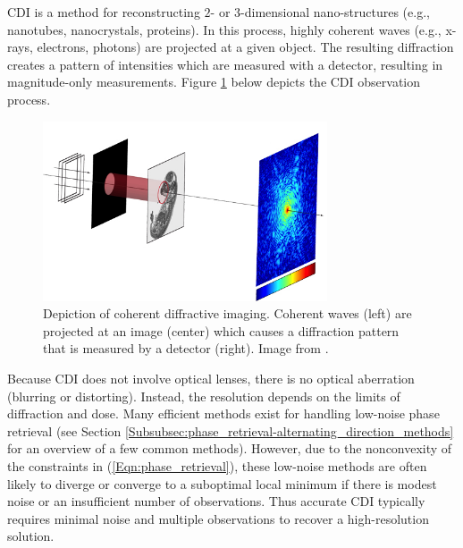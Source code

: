 CDI is a method for reconstructing $2$- or $3$-dimensional nano-structures (e.g., nanotubes, nanocrystals, proteins).  In this process, highly coherent waves (e.g., x-rays, electrons, photons) are projected at a given object.  The resulting diffraction creates a pattern of intensities which are measured with a detector, resulting in magnitude-only measurements.  Figure \ref{Fig:CDI} below depicts the CDI observation process.

\begin{figure}[H]
  \centering
    \includegraphics[width=0.75\textwidth]{phase_retrieval_depiction_mod.jpg}
   \caption{Depiction of coherent diffractive imaging.  Coherent waves (left) are projected at an image (center) which causes a diffraction pattern that is measured by a detector (right). Image from \cite{Guizar-Sicairos}.}
   \label{Fig:CDI}
\end{figure}

Because CDI does not involve optical lenses, there is no optical aberration (blurring or distorting).  Instead, the resolution depends on the limits of diffraction and dose.  Many efficient methods exist for handling low-noise phase retrieval (see Section \ref{Subsubsec:phase_retrieval-alternating_direction_methods} for an overview of a few common methods).  However, due to the nonconvexity of the constraints in (\ref{Eqn:phase_retrieval}), these low-noise methods are often likely to diverge or converge to a suboptimal local minimum if there is modest noise or an insufficient number of observations.  Thus accurate CDI typically requires minimal noise and multiple observations to recover a high-resolution solution.




